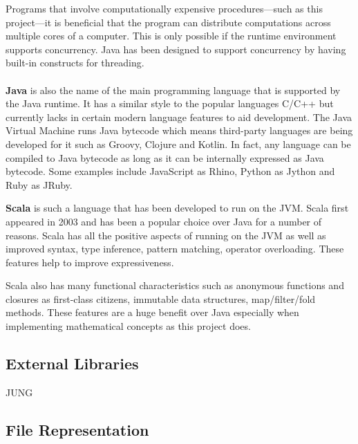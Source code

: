     Programs that involve computationally expensive procedures---such as this project---it is beneficial that the program can distribute computations across multiple cores of a computer. This is only possible if the runtime environment supports concurrency. Java has been designed to support concurrency by having built-in constructs for threading. 

    \paragraph{}

    \textbf{Java} is also the name of the main programming language that is supported by the Java runtime. It has a similar style to the popular languages C/C++ but currently lacks in certain modern language features to aid development. The Java Virtual Machine runs Java bytecode which means third-party languages are being developed for it such as Groovy, Clojure and Kotlin. In fact, any language can be compiled to Java bytecode as long as it can be internally expressed as Java bytecode. Some examples include JavaScript as Rhino, Python as Jython and Ruby as JRuby.

    \textbf{Scala} is such a language that has been developed to run on the JVM. Scala first appeared in 2003 and has been a popular choice over Java for a number of reasons.
    Scala has all the positive aspects of running on the JVM as well as improved syntax, type inference, pattern matching, operator overloading. These features help to improve expressiveness.

    Scala also has many functional characteristics such as anonymous functions and closures as first-class citizens, immutable data structures, map/filter/fold methods. These features are a huge benefit over Java especially when implementing mathematical concepts as this project does.

\subsection{External Libraries}
  JUNG

\subsection{File Representation}
